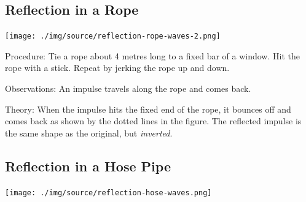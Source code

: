 \begin{multicols}{2}
\columnbreak

\subsection{Reflection in a Rope}

\begin{center}
\texttt{[image: ./img/source/reflection-rope-waves-2.png]}
\end{center}

\begin{description*}
\item[Procedure:]{Tie a rope about 4 metres long to a fixed bar of a window. Hit the rope with a stick. Repeat by jerking the rope up and down.}
\item[Observations:]{An impulse travels along the rope and comes back.}
\item[Theory:]{When the impulse hits the fixed end of the rope, it bounces off and comes back as shown by the dotted lines in the figure. The reflected impulse is the same shape as the original, but \emph{inverted}.}
\end{description*}

\subsection{Reflection in a Hose Pipe}

\begin{center}
\texttt{[image: ./img/source/reflection-hose-waves.png]}
\end{center}


\end{multicols}
